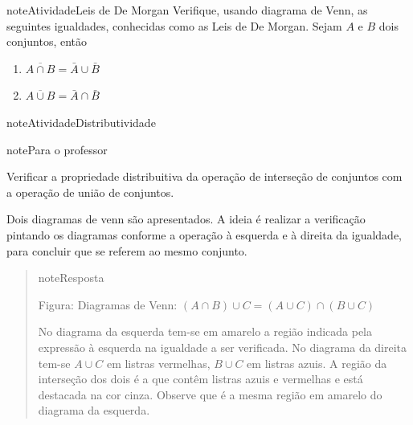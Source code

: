 \begin{sphinxadmonition}{note}{Atividade}{Leis de De Morgan}
Verifique, usando diagrama de Venn, as seguintes igualdades, conhecidas como as Leis de De Morgan. Sejam \(A\) e \(B\) dois conjuntos, então
\begin{enumerate}
\item {} 
\(\displaystyle{\overline{A\cap B}}=\bar{A}\cup \bar{B}\)

\item {} 
\(\overline{A\cup B}=\bar{A}\cap \bar{B}\)

\end{enumerate}
\end{sphinxadmonition}
\begin{sphinxadmonition}{note}{Atividade}{Distributividade}
\label{ativ-distributividade}

\begin{sphinxadmonition}{note}{Para o professor}

 Verificar a propriedade distribuitiva da operação de interseção de conjuntos com a operação de união de conjuntos.

 Dois diagramas de venn são apresentados. A ideia é realizar a verificação pintando os diagramas conforme a operação à esquerda e à direita da igualdade, para concluir que se referem ao mesmo conjunto.
\begin{quote}

\begin{sphinxadmonition}{note}{Resposta}
\begin{quote}
\label{\detokenize{PE511-2:id2}}
\begin{figure}[H]
\centering

\noindent{}
\label{\detokenize{PE511-2:id2}}\end{figure}
\end{quote}

Figura: Diagramas de Venn: \((A\cap B)\cup C=(A\cup C)\cap (B\cup C)\)

No diagrama da esquerda tem-se em amarelo a região indicada pela expressão à esquerda na igualdade a ser verificada. No diagrama da direita tem-se \(A\cup C\) em listras vermelhas, \(B\cup C\) em listras azuis. A região da interseção dos dois é a que contêm listras azuis e vermelhas e está destacada na cor cinza. Observe que é a mesma região em amarelo do diagrama da esquerda.
\end{sphinxadmonition}
\end{quote}
\end{sphinxadmonition}
\end{sphinxadmonition}

